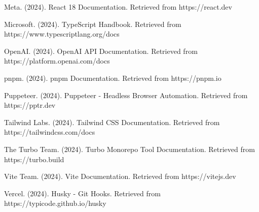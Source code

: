 \documentclass[12pt,a4paper]{article}
\begin{document}
\noindent Meta. (2024). React 18 Documentation. Retrieved from https://react.dev

\noindent Microsoft. (2024). TypeScript Handbook. Retrieved from https://www.typescriptlang.org/docs

\noindent OpenAI. (2024). OpenAI API Documentation. Retrieved from https://platform.openai.com/docs

\noindent pnpm. (2024). pnpm Documentation. Retrieved from https://pnpm.io

\noindent Puppeteer. (2024). Puppeteer - Headless Browser Automation. Retrieved from https://pptr.dev

\noindent Tailwind Labs. (2024). Tailwind CSS Documentation. Retrieved from https://tailwindcss.com/docs

\noindent The Turbo Team. (2024). Turbo Monorepo Tool Documentation. Retrieved from https://turbo.build

\noindent Vite Team. (2024). Vite Documentation. Retrieved from https://vitejs.dev

\noindent Vercel. (2024). Husky - Git Hooks. Retrieved from https://typicode.github.io/husky
\end{document}
